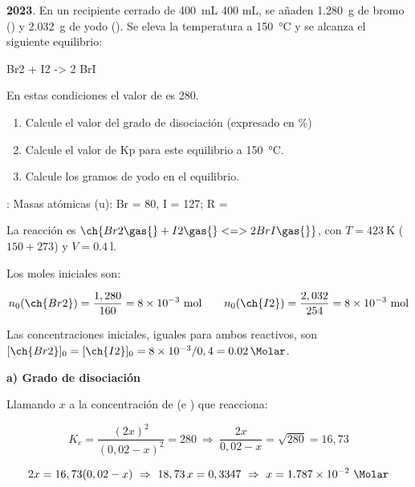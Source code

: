 \begin{exerciseEVAU}
    \textbf{2023}. En un recipiente cerrado de \qty{400}{\mL} 400 mL, se añaden \qty{1.280}{\g} de bromo () y \qty{2.032}{\g} de yodo (). Se eleva la temperatura a \qty{150}{\celsius}  y se alcanza el siguiente equilibrio:
    \begin{reaction*}
        Br2 \gas{} + I2 \gas{} -> 2 BrI \gas{}
    \end{reaction*}
    En estas condiciones el valor de \Kc es 280.
    \begin{enumerate}[label=\letraminuscula]
        \item Calcule el valor del grado de disociación (expresado en \%)
        \item Calcule el valor de Kp para este equilibrio a \qty{150}{\celsius}.
        \item Calcule los gramos de yodo en el equilibrio.
    \end{enumerate}

    \datos{}: Masas atómicas (u): Br = 80, I = 127; R = \ctegases{}

    \begin{solu}

        La reacción es \(\ch{Br2 \gas{} + I2 \gas{} <=> 2 BrI \gas{}}\), con \(T = \SI{423}{\kelvin}\) (\(150+273\)) y \(V = \SI{0.4}{\litre}\).

        Los moles iniciales son:

        \begin{equation*}
            n_0(\ch{Br2}) = \dfrac{1,280}{160} = 8 \times 10^{-3} \ \text{mol} \qquad n_0(\ch{I2}) = \dfrac{2,032}{254} = 8 \times 10^{-3} \ \text{mol}
        \end{equation*}

        Las concentraciones iniciales, iguales para ambos reactivos, son \([\ch{Br2}]_0 = [\ch{I2}]_0 = 8\times 10^{-3}/0,4 = \SI{0.02}{\Molar}\).

        \textbf{a) Grado de disociación}

        Llamando \(x\) a la concentración de  (e ) que reacciona:

        \begin{equation*}
            K_c = \dfrac{(2x)^2}{(0,02-x)^2} = 280 \ \Rightarrow \ \dfrac{2x}{0,02-x} = \sqrt{280} = 16,73
        \end{equation*}

        \begin{equation*}
            2x = 16,73(0,02 - x) \ \Rightarrow \ 18,73\, x = 0,3347 \ \Rightarrow \ x = \num{1.787e-2} \ \si{\Molar}
        \end{equation*}


\end{solu}
\end{exerciseEVAU}
